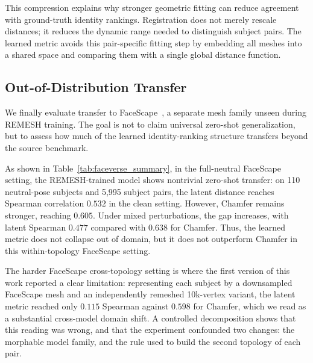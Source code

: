 \documentclass{article}
\begin{document}
This compression explains why stronger geometric fitting can reduce agreement with ground-truth identity rankings. Registration does not merely rescale distances; it reduces the dynamic range needed to distinguish subject pairs. The learned metric avoids this pair-specific fitting step by embedding all meshes into a shared space and comparing them with a single global distance function.

\subsection{Out-of-Distribution Transfer}
\label{sec:ood_transfer}
We finally evaluate transfer to FaceScape~\cite{facescape}, a separate mesh family unseen during REMESH training. The goal is not to claim universal zero-shot generalization, but to assess how much of the learned identity-ranking structure transfers beyond the source benchmark.

As shown in Table~\ref{tab:faceverse_summary}, in the full-neutral FaceScape setting, the REMESH-trained model shows nontrivial zero-shot transfer: on 110 neutral-pose subjects and 5,995 subject pairs, the latent distance reaches Spearman correlation $0.532$ in the clean setting. However, Chamfer remains stronger, reaching $0.605$. Under mixed perturbations, the gap increases, with latent Spearman $0.477$ compared with $0.638$ for Chamfer. Thus, the learned metric does not collapse out of domain, but it does not outperform Chamfer in this within-topology FaceScape setting.

The harder FaceScape cross-topology setting is where the first version of this work
reported a clear limitation: representing each subject by a downsampled FaceScape mesh and
an independently remeshed 10k-vertex variant, the latent metric reached only $0.115$
Spearman against $0.598$ for Chamfer, which we read as a substantial cross-model domain
shift. A controlled decomposition shows that this reading was wrong, and that the
experiment confounded two changes: the morphable model family, and the rule used to build
the second topology of each pair.
\end{document}
